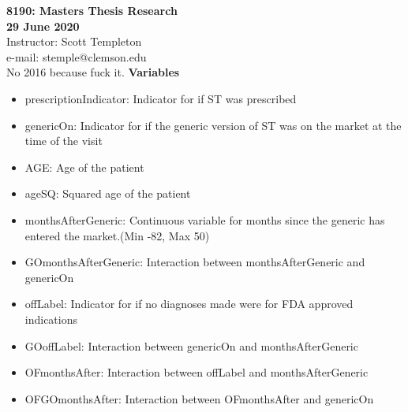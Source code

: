 
\let\counterwithout\relax
\let\counterwithin\relax
{}



\noindent \textbf{8190: Masters Thesis Research}\\
\noindent \textbf{29 June 2020}\\
\noindent Instructor: Scott Templeton \\
e-mail: stemple@clemson.edu\\

\noindent No 2016 because fuck it.
\noindent \textbf{Variables}\\
\begin{itemize}
    \item prescriptionIndicator: Indicator for if ST was prescribed
    \item genericOn: Indicator for if the generic version of ST was on the market at the time of the visit
    \item AGE: Age of the patient
    \item ageSQ: Squared age of the patient
    \item monthsAfterGeneric: Continuous variable for months since the generic has entered the market.(Min -82, Max 50)
    \item GOmonthsAfterGeneric: Interaction between monthsAfterGeneric and genericOn
    \item offLabel: Indicator for if no diagnoses made were for FDA approved indications
    \item GOoffLabel: Interaction between genericOn and monthsAfterGeneric
    \item OFmonthsAfter: Interaction between offLabel and monthsAfterGeneric
    \item OFGOmonthsAfter: Interaction between OFmonthsAfter and genericOn
\end{itemize}
\begin{landscape}

\newpage

\newpage

\newpage

\newpage

\newpage

\newpage

\end{landscape}




